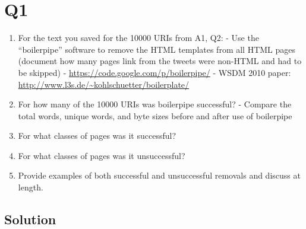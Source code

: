  


\section{Q1}
\label{part1}
\begin{enumerate}


\item For the text you saved for the 10000 URIs from A1, Q2:
- Use the “boilerpipe” software to remove the HTML templates from all HTML pages (document how many pages link from the tweets were non-HTML and had to be skipped)
- \url{https://code.google.com/p/boilerpipe/}
- WSDM 2010 paper: \url{http://www.l3s.de/~kohlschuetter/boilerplate/}

\item For how many of the 10000 URIs was boilerpipe successful?
- Compare the total words, unique words, and byte sizes before and after use of boilerpipe

\item For what classes of pages was it successful?

\item For what classes of pages was it unsuccessful?

\item Provide examples of both successful and unsuccessful removals and discuss at length.

\end{enumerate}

\subsection{Solution}

